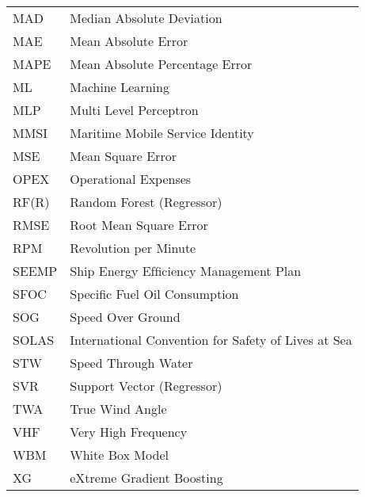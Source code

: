 \begin{longtable}[l]{>{}l<{}l}
MAD         & Median Absolute Deviation \\%
MAE         & Mean Absolute Error \\%
MAPE        & Mean Absolute Percentage Error \\%
ML          & Machine Learning\\%
MLP         & Multi Level Perceptron\\%
MMSI        & Maritime Mobile Service Identity \\%
MSE         & Mean Square Error\\%
OPEX        & Operational Expenses\\%
RF(R)       & Random Forest (Regressor)\\%
RMSE        & Root Mean Square Error\\%
RPM         & Revolution per Minute\\%
SEEMP       & Ship Energy Efﬁciency Management Plan\\%
SFOC        & Specific Fuel Oil Consumption \\%
SOG         & Speed Over Ground \\%
SOLAS       & International Convention for Safety of Lives at Sea\\%
STW         & Speed Through Water \\%
SVR         & Support Vector (Regressor)\\%
TWA         & True Wind Angle\\%
VHF         & Very High Frequency\\%
WBM         & White Box Model\\%
XG          & eXtreme Gradient Boosting\\%

\end{longtable}

\setlength{\extrarowheight}{0pt}